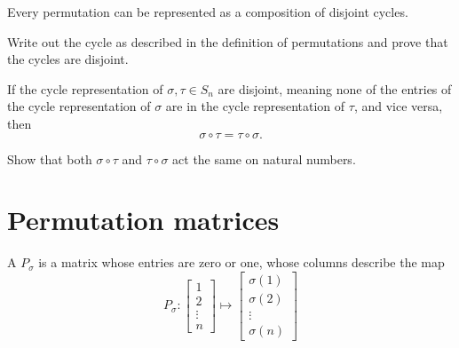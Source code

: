 \documentclass{ximera}
\begin{document}
\begin{lemma}\label{L:CC}
  Every permutation can be represented as a composition of disjoint
  cycles.
  \begin{sketch}
    Write out the cycle as described in the definition of permutations
    and prove that the cycles are disjoint.
  \end{sketch}
\end{lemma}

\begin{lemma}
  If the cycle representation of $\sigma,\tau\in S_n$ are disjoint,
  meaning none of the entries of the cycle representation of $\sigma$
  are in the cycle representation of $\tau$, and vice versa, then
  \[
  \sigma \circ \tau = \tau \circ \sigma.
  \]
  \begin{sketch}
    Show that both $\sigma \circ \tau$ and $\tau \circ \sigma$ act the
    same on natural numbers.
  \end{sketch} 
\end{lemma}



\section{Permutation matrices}

\begin{definition}
  A  $P_\sigma$ is a matrix whose entries are
  zero or one, whose columns describe the map
  \[
  P_\sigma : \begin{bmatrix}
    1 \\
    2 \\
    \vdots \\
    n
  \end{bmatrix}
  \mapsto
  \begin{bmatrix}
    \sigma(1) \\
    \sigma(2) \\
    \vdots \\
    \sigma(n)
  \end{bmatrix}
  \]
\end{definition}
\end{document}
